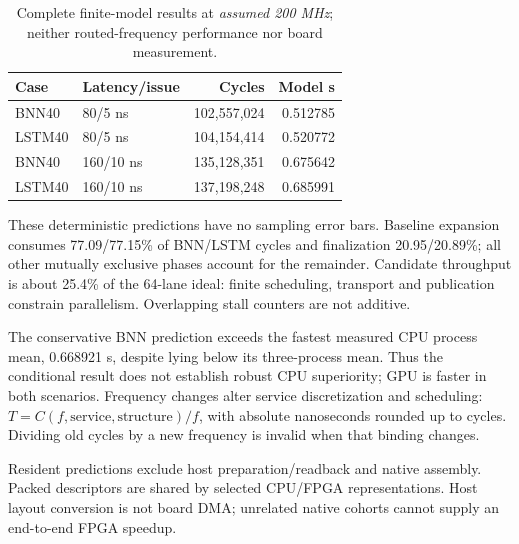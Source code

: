\begin{table}[t]\centering
\caption{Complete finite-model results at \emph{assumed 200 MHz}; neither routed-frequency performance nor board measurement.}\label{tab:model}
\begin{tabular}{llrr}\toprule Case & Latency/issue & Cycles & Model s\\\midrule
BNN40 & 80/5 ns & 102,557,024 & 0.512785\\
LSTM40 & 80/5 ns & 104,154,414 & 0.520772\\
BNN40 & 160/10 ns & 135,128,351 & 0.675642\\
LSTM40 & 160/10 ns & 137,198,248 & 0.685991\\
\bottomrule\end{tabular}
\end{table}

These deterministic predictions have no sampling error bars. Baseline expansion consumes 77.09/77.15\% of BNN/LSTM cycles and finalization 20.95/20.89\%; all other mutually exclusive phases account for the remainder. Candidate throughput is about 25.4\% of the 64-lane ideal: finite scheduling, transport and publication constrain parallelism. Overlapping stall counters are not additive.

The conservative BNN prediction exceeds the fastest measured CPU process mean, 0.668921 s, despite lying below its three-process mean. Thus the conditional result does not establish robust CPU superiority; GPU is faster in both scenarios. Frequency changes alter service discretization and scheduling: $T=C(f,\text{service},\text{structure})/f$, with absolute nanoseconds rounded up to cycles. Dividing old cycles by a new frequency is invalid when that binding changes.

Resident predictions exclude host preparation/readback and native assembly. Packed descriptors are shared by selected CPU/FPGA representations. Host layout conversion is not board DMA; unrelated native cohorts cannot supply an end-to-end FPGA speedup.
